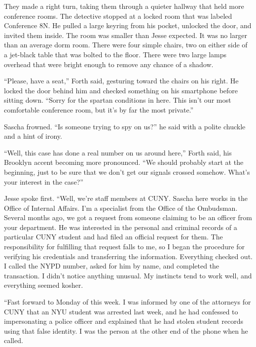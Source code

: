 \documentclass[12pt]{book}
\begin{document}
They made a right turn, taking them through a quieter hallway that held more conference rooms.  The detective stopped at a locked room that was labeled Conference 8N.  He pulled a large keyring from his pocket, unlocked the door, and invited them inside.  The room was smaller than Jesse expected.  It was no larger than an average dorm room.  There were four simple chairs, two on either side of a jet-black table that was bolted to the floor.  There were two large lamps overhead that were bright enough to remove any chance of a shadow.

``Please, have a seat,'' Forth said, gesturing toward the chairs on his right.  He locked the door behind him and checked something on his smartphone before sitting down.  ``Sorry for the spartan conditions in here.  This isn't our most comfortable conference room, but it's by far the most private.''

Sascha frowned.  ``Is someone trying to spy on us?'' he said with a polite chuckle and a hint of irony.

``Well, this case has done a real number on us around here,'' Forth said, his Brooklyn accent becoming more pronounced.  ``We should probably start at the beginning, just to be sure that we don't get our signals crossed somehow.  What's your interest in the case?''

Jesse spoke first.  ``Well, we're staff members at CUNY.  Sascha here works in the Office of Internal Affairs.  I'm a specialist from the Office of the Ombudsman.  Several months ago, we got a request from someone claiming to be an officer from your department.  He was interested in the personal and criminal records of a particular CUNY student and had filed an official request for them.  The responsibility for fulfilling that request falls to me, so I began the procedure for verifying his credentials and transferring the information.  Everything checked out.  I called the NYPD number, asked for him by name, and completed the transaction.  I didn't notice anything unusual.  My instincts tend to work well, and everything seemed kosher.

``Fast forward to Monday of this week.  I was informed by one of the attorneys for CUNY that an NYU student was arrested last week, and he had confessed to impersonating a police officer and explained that he had stolen student records using that false identity.  I was the person at the other end of the phone when he called.
\end{document}
